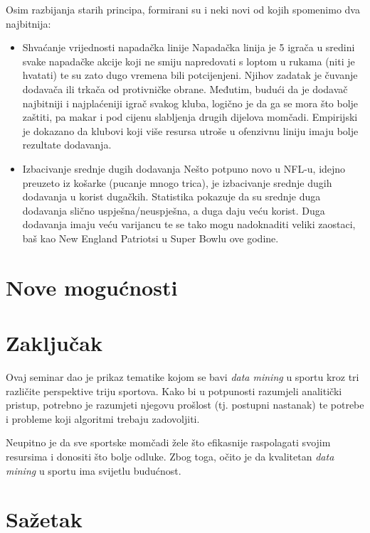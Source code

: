 \documentclass{ferseminar}
\begin{document}
Osim razbijanja starih principa, formirani su i neki novi od kojih spomenimo dva najbitnija:
\begin{itemize}
	\item Shvaćanje vrijednosti napadačka linije
	\newline
	Napadačka linija je 5 igrača u sredini svake napadačke akcije koji ne smiju napredovati s loptom u rukama (niti je hvatati) te su zato dugo vremena bili potcijenjeni. Njihov zadatak je čuvanje dodavača ili trkača od protivničke obrane. Međutim, budući da je dodavač najbitniji i najplaćeniji igrač svakog kluba, logično je da ga se mora što bolje zaštiti, pa makar i pod cijenu slabljenja drugih dijelova momčadi. Empirijski je dokazano da klubovi koji više resursa utroše u ofenzivnu liniju imaju bolje rezultate dodavanja. \cite{OL}
	\item Izbacivanje srednje dugih dodavanja \cite{Deep}
	\newline
	Nešto potpuno novo u NFL-u, idejno preuzeto iz košarke (pucanje mnogo trica), je izbacivanje srednje dugih dodavanja u korist dugačkih. Statistika pokazuje da su srednje duga dodavanja slično uspješna/neuspješna, a duga daju veću korist. Duga dodavanja imaju veću varijancu te se tako mogu nadoknaditi veliki zaostaci, baš kao New England Patriotsi u Super Bowlu ove godine. \cite{NEP}
\end{itemize}

\section{Nove mogućnosti}
\section{Zaključak}

Ovaj seminar dao je prikaz tematike kojom se bavi \textit{data mining} u sportu kroz tri različite perspektive triju sportova. Kako bi u potpunosti razumjeli analitički pristup, potrebno je razumjeti njegovu prošlost (tj. postupni nastanak) te potrebe i probleme koji algoritmi trebaju zadovoljiti.

Neupitno je da sve sportske momčadi žele što efikasnije raspolagati svojim resursima i donositi što bolje odluke. Zbog toga, očito je da kvalitetan \textit{data mining} u sportu ima svijetlu budućnost.

\section{Sažetak}
\end{document}
